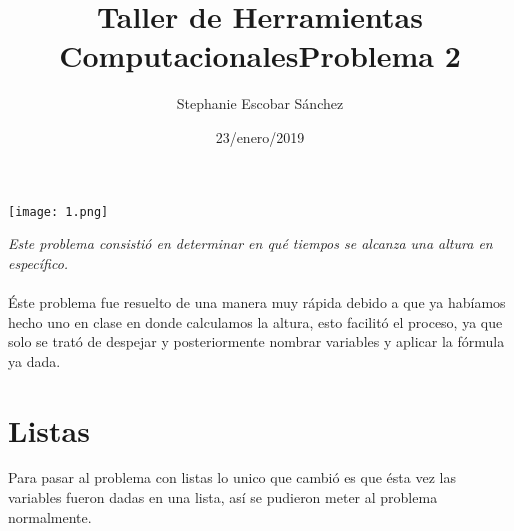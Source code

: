 \documentclass{article}
\title{\Huge Taller de Herramientas Computacionales}
\author{Stephanie Escobar Sánchez}
\date{23/enero/2019}
\begin{document}
	\maketitle
	\begin{center}
		\texttt{[image: 1.png]}	
	\end{center}
\newpage
	\begin{center}
		\title {\Huge Problema 2} 
	\end{center}
\textit{Este problema consistió en determinar en qué tiempos se alcanza una altura en específico.}\\
\\
Éste problema fue resuelto de una manera muy rápida debido a que ya habíamos hecho uno en clase en donde calculamos la altura, esto facilitó el proceso, ya que solo se trató de despejar y posteriormente nombrar variables y aplicar la fórmula ya dada.

\section*{Listas}

Para pasar al problema con listas lo unico que cambió es que ésta vez las variables fueron dadas en una lista, así se pudieron meter al problema normalmente.
\end{document}
